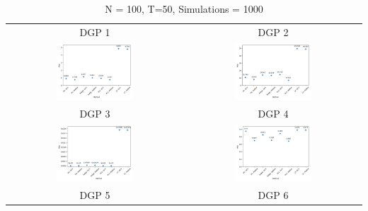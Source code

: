 \begin{table}[h! ]
     \centering
     \caption*{N = 100, T=50, Simulations = 1000}
     \begin{tabular}{c c}
     DGP 1 & DGP 2 \\
         \includegraphics[width=0.45\textwidth]{figures/N100_T50_DGP1_Sims1000.png} & \includegraphics[width=0.45\textwidth]{figures/N100_T50_DGP2_Sims1000.png} \\
                 DGP 3 & DGP 4 \\
         \includegraphics[width=0.45\textwidth]{figures/N100_T50_DGP3_Sims1000} &
         \includegraphics[width=0.45\textwidth]{figures/N100_T50_DGP4_Sims1000} \\
         DGP 5 & DGP 6 \\

\end{tabular}
\end{table}
